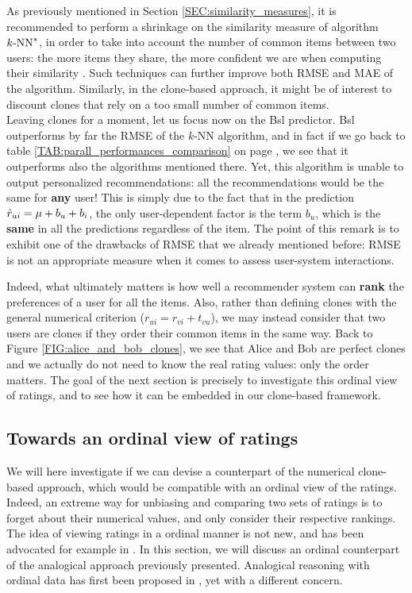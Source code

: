 As previously mentioned in Section \ref{SEC:similarity_measures}, it is recommended to perform a
shrinkage on the similarity measure of algorithm $k\text{-NN}^*$, in order to take into
account the number of common items between two users: the more items they
share, the more confident we are when computing their similarity
\cite{KorACM2010}. Such techniques can further improve both RMSE and MAE of the
algorithm.  Similarly, in the clone-based approach, it might be of interest to
discount clones that rely on a too small number of common items.\\

Leaving clones for a moment, let us focus now on the Bsl predictor. Bsl outperforms by far the RMSE of the
$k$-NN algorithm, and in fact if we go back to table
\ref{TAB:parall_performances_comparison} on page
\pageref{TAB:parall_performances_comparison}, we see that it outperforms also the
algorithms mentioned there. Yet, this algorithm is unable to output
personalized recommendations: all the recommendations would be the same for
\textbf{any} user! This is simply due to the fact that in the prediction
$\hat{r}_{ui} = \mu  + b_u + b_i$, the only user-dependent factor is the term
$b_u$, which is the \textbf{same} in all the predictions regardless of the
item. The point of this remark is to exhibit one of the drawbacks of RMSE that
we already mentioned before: RMSE is not an appropriate measure when it comes
to assess user-system interactions.

Indeed, what ultimately matters is how well a recommender system can
\textbf{rank} the preferences of a user for all the items. Also, rather than
defining clones with the general numerical criterion ($r_{ui} = r_{vi} +
t_{vu}$), we may instead consider that two users are clones if they order their
common items in the same way. Back to Figure \ref{FIG:alice_and_bob_clones}, we
see that Alice and Bob are perfect clones and we actually do not need to know
the real rating values: only the order matters. The goal of the next section is
precisely to investigate this ordinal view of ratings, and to see how it can be
embedded in our clone-based framework.

\subsection{Towards an ordinal view of ratings}

We will here investigate if we can devise a counterpart of the numerical clone-based
approach, which would be compatible with an ordinal view of the ratings.
Indeed, an extreme way for unbiasing and comparing two sets of ratings is to
forget about their numerical values, and only consider their respective rankings. The
idea of viewing ratings in a ordinal manner is not new, and has been advocated
for example in \cite{KorSillRECSYS11}.  In this section, we will discuss an
ordinal counterpart of the analogical approach previously presented.
Analogical reasoning with ordinal data has first been proposed in
\cite{MicBarCAP09}, yet with a different concern.

